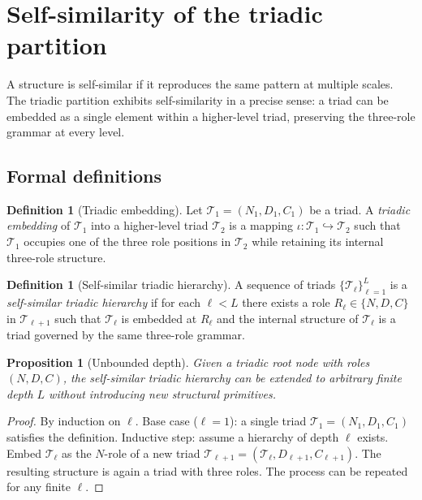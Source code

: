 \documentclass[12pt]{article}
\newtheorem{proposition}[theorem]{Proposition}
\theoremstyle{definition}
\newtheorem{definition}[theorem]{Definition}
\theoremstyle{remark}
\begin{document}
\section{Self-similarity of the triadic partition}\label{sec:selfsim}

A structure is self-similar if it reproduces the same pattern at multiple scales.  The
triadic partition exhibits self-similarity in a precise sense: a triad can be embedded
as a single element within a higher-level triad, preserving the three-role grammar at
every level.

\subsection{Formal definitions}

\begin{definition}[Triadic embedding]\label{def:embedding}
Let $\mathcal{T}_1 = (N_1, D_1, C_1)$ be a triad.  A \emph{triadic embedding} of
$\mathcal{T}_1$ into a higher-level triad $\mathcal{T}_2$ is a mapping
$\iota\colon \mathcal{T}_1 \hookrightarrow \mathcal{T}_2$ such that $\mathcal{T}_1$
occupies one of the three role positions in $\mathcal{T}_2$ while retaining its
internal three-role structure.
\end{definition}

\begin{definition}[Self-similar triadic hierarchy]\label{def:hierarchy}
A sequence of triads $\{\mathcal{T}_\ell\}_{\ell=1}^{L}$ is a \emph{self-similar
triadic hierarchy} if for each $\ell < L$ there exists a role $R_\ell \in \{N, D, C\}$
in $\mathcal{T}_{\ell+1}$ such that $\mathcal{T}_\ell$ is embedded at $R_\ell$ and
the internal structure of $\mathcal{T}_\ell$ is a triad governed by the same
three-role grammar.
\end{definition}

\begin{proposition}[Unbounded depth]\label{prop:unbounded}
Given a triadic root node with roles $(N, D, C)$, the self-similar triadic hierarchy
can be extended to arbitrary finite depth $L$ without introducing new structural
primitives.
\end{proposition}
\begin{proof}
By induction on $\ell$.  Base case ($\ell = 1$): a single triad
$\mathcal{T}_1 = (N_1, D_1, C_1)$ satisfies the definition.  Inductive step: assume a
hierarchy of depth $\ell$ exists.  Embed $\mathcal{T}_\ell$ as the $N$-role of a new
triad $\mathcal{T}_{\ell+1} = (\mathcal{T}_\ell, D_{\ell+1}, C_{\ell+1})$.  The
resulting structure is again a triad with three roles.  The process can be repeated for
any finite $\ell$.
\end{proof}
\end{document}
